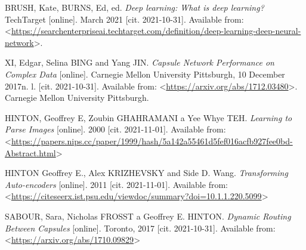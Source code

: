 

\begin{thebibliography}{99}
	
    BRUSH, Kate, BURNS, Ed, ed. \emph{Deep learning: What is deep learning? } TechTarget [online]. March 2021 [cit. 2021-10-31]. 
    Available from: <\url {https://searchenterpriseai.techtarget.com/definition/deep-learning-deep-neural-network}>.

    XI, Edgar, Selina BING and Yang JIN. \emph{Capsule Network Performance on Complex Data} [online]. Carnegie Mellon University Pittsburgh, 10 December 2017n. l. [cit. 2021-10-31].
    Available from: <\url{https://arxiv.org/abs/1712.03480}>. Carnegie Mellon University Pittsburgh.

HINTON, Geoffrey E, Zoubin GHAHRAMANI a Yee Whye TEH. \emph{Learning to Parse Images} [online]. 2000 [cit. 2021-11-01]. 
Available from: <\url{https://papers.nips.cc/paper/1999/hash/5a142a55461d5fef016acfb927fee0bd-Abstract.html}>

    HINTON Geoffrey E., Alex KRIZHEVSKY and Side D. Wang. \emph{Transforming Auto-encoders }[online]. 2011 [cit. 2021-11-01]. 
    Available from: <\url{https://citeseerx.ist.psu.edu/viewdoc/summary?doi=10.1.1.220.5099}>

    SABOUR, Sara, Nicholas FROSST a Geoffrey E. HINTON. \emph{Dynamic Routing Between Capsules }[online]. Toronto, 2017 [cit. 2021-10-31]. 
    Available from: <\url{https://arxiv.org/abs/1710.09829}>
\end{thebibliography}


%
%
%
